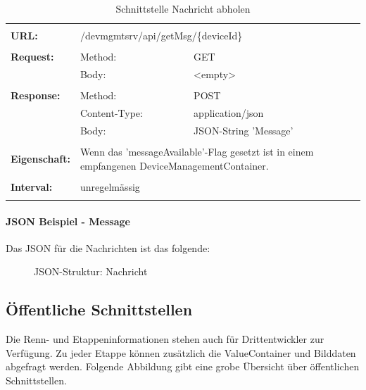 {\renewcommand{\arraystretch}{1}
\begin{longtable}{ p{2.5cm} || p{3.5cm} p{5.5cm}}
&  \\ [-1.5ex]

	\textbf{URL:} & \multicolumn{2}{p{9cm}}{/devmgmtsrv/api/getMsg/\{deviceId\}}  \\ [1ex] \hline & &  \\ [-1.5ex]
	\textbf{Request:} & Method: & GET \\
		& Body: & <empty>  \\ [1ex] \hline & &  \\ [-1.5ex]
	\textbf{Response:} & Method: & POST \\
		& Content-Type: & application/json \\
		& Body: & JSON-String 'Message' \\ [1ex] \hline & &  \\ [-1.5ex]
	\textbf{Eigenschaft:} & \multicolumn{2}{p{9cm}}{ Wenn das 'messageAvailable'-Flag gesetzt ist in einem empfangenen DeviceManagementContainer.}  \\ [1ex] \hline & &  \\ [-1.5ex]
	\textbf{Interval:} & \multicolumn{2}{p{9cm}}{unregelmässig} \\ [1ex] 
	
\caption{Schnittstelle Nachricht abholen}
\end{longtable} }

\paragraph{JSON Beispiel - Message}
Das JSON für die Nachrichten ist das folgende:
\begin{figure}[H]
	\centering
	
	\caption{JSON-Struktur: Nachricht}
\end{figure}

\newpage
\subsection{Öffentliche Schnittstellen}
\label{sec:tourlivepublicapi}

Die Renn- und Etappeninformationen stehen auch für Drittentwickler zur Verfügung. Zu jeder Etappe können zusätzlich die ValueContainer und Bilddaten abgefragt werden. Folgende Abbildung gibt eine grobe Übersicht über öffentlichen Schnittstellen.

